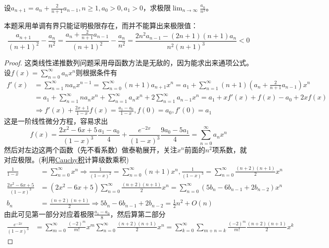 \documentclass[../../main.tex]{subfiles}
\begin{document}
\begin{example}
设\(a_{n + 1}=a_n+\frac{2}{n + 1}a_{n - 1},n\geqslant 1,a_0>0,a_1>0\)，求极限\(\lim_{n\rightarrow\infty}\frac{a_n}{n^2}\)。
\end{example}
\begin{remark}
本题采用单调有界只能证明极限存在，而并不能算出来极限值：
\[
\frac{a_{n + 1}}{(n + 1)^2}-\frac{a_n}{n^2}=\frac{a_n+\frac{2}{n + 1}a_{n - 1}}{(n + 1)^2}-\frac{a_n}{n^2}=\frac{2n^2a_{n - 1}-(2n + 1)(n + 1)a_n}{n^2(n + 1)^3}<0
\]
\end{remark}
\begin{proof}
这类线性递推数列问题采用母函数方法是无敌的，因为能求出来通项公式。
设\(f(x)=\sum_{n = 0}^{\infty}a_nx^n\)则根据条件有
\begin{align*}
f'(x)&=\sum_{n = 1}^{\infty}na_nx^{n - 1}=\sum_{n = 0}^{\infty}(n + 1)a_{n + 1}x^n=a_1+\sum_{n = 1}^{\infty}(n + 1)\left(a_n+\frac{2}{n + 1}a_{n - 1}\right)x^n\\
&=a_1+\sum_{n = 1}^{\infty}na_nx^n+\sum_{n = 1}^{\infty}a_nx^n+2\sum_{n = 1}^{\infty}a_{n - 1}x^n=a_1+xf'(x)+f(x)-a_0+2xf(x)\\
&\Rightarrow f'(x)+\frac{2x + 1}{1 - x}f(x)=\frac{a_1 - a_0}{1 - x},f(0)=a_0,f'(0)=a_1
\end{align*}
这是一阶线性微分方程，容易求出
\[f(x)=\frac{2x^2 - 6x + 5}{(1 - x)^3}\frac{a_1 - a_0}{4}+\frac{e^{-2x}}{(1 - x)^3}\frac{9a_0 - 5a_1}{4}=\sum_{n = 0}^{\infty}a_nx^n\]
然后对左边这两个函数（先不看系数）做泰勒展开，关注\(x^n\)前面的\(n^2\)项系数，就对应极限。(利用\hyperref[corollary:收敛级数Cauchy积收敛则就等于级数积]{Cauchy积}计算级数乘积)
\begin{align*}
\frac{1}{1 - x}&=\sum_{n = 0}^{\infty}x^n\Rightarrow\frac{1}{(1 - x)^2}=\sum_{n = 0}^{\infty}(n + 1)x^n,\frac{1}{(1 - x)^3}=\sum_{n = 0}^{\infty}\frac{(n + 2)(n + 1)}{2}x^n\\
\frac{2x^2 - 6x + 5}{(1 - x)^3}&=(2x^2 - 6x + 5)\sum_{n = 0}^{\infty}\frac{(n + 2)(n + 1)}{2}x^n=\sum_{n = 0}^{\infty}(5b_n - 6b_{n - 1}+2b_{n - 2})x^n\\
b_n&=\frac{(n + 2)(n + 1)}{2}\Rightarrow 5b_n - 6b_{n - 1}+2b_{n - 2}=\frac{1}{2}n^2+O(n)
\end{align*}
由此可见第一部分对应着极限\(\frac{a_1 - a_0}{8}\)，然后算第二部分
\begin{align*}
\frac{e^{-2x}}{(1 - x)^3}&=\sum_{m = 0}^{\infty}\frac{(-2)^m}{m!}x^m\sum_{n = 0}^{\infty}\frac{(n + 2)(n + 1)}{2}x^n=\sum_{k = 0}^{\infty}\sum_{m + n = k}\frac{(-2)^m}{m!}\frac{(n + 2)(n + 1)}{2}x^k
\end{align*}

\end{proof}
\end{document}
